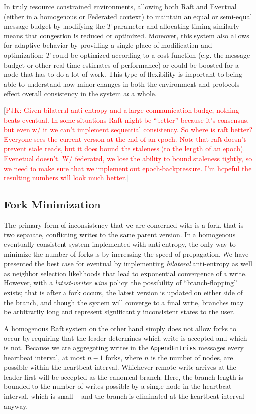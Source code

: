 \documentclass[10pt,conference,compsocconf,letterpaper]{IEEEtran}
\newcommand{\todo}[1]{{\textcolor{red}{#1}}}
\newcommand{\pjk}[1]{[\todo{PJK: #1}]}
\begin{document}
In truly resource constrained environments, allowing both Raft and Eventual (either in a homogenous or Federated context) to maintain an equal or semi-equal message budget by modifying the $T$ parameter and allocating timing similarly means that congestion is reduced or optimized. Moreover, this system also allows for adaptive behavior by providing a single place of modification and optimization; $T$ could be optimized according to a cost function (e.g. the message budget or other real time estimates of performance) or could be boosted for a node that has to do a lot of work. This type of flexibility is important to being able to understand how minor changes in both the environment and protocols effect overall consistency in the system as a whole.

\pjk{Given bilateral anti-entropy and a large communication budge, nothing beats eventual. In some situations Raft might be ``better'' because it's consensus, but even w/ it we can't implement sequential consistency. So where is raft better?  Everyone sees the current version at the end of an epoch. Note that raft doesn't prevent stale reads, but it does bound the staleness (to the length of an epoch). Evenetual doesn't.   W/ federated, we lose the ability to bound staleness tightly, so we need to make sure that we implement out epoch-backpressure. I'm hopeful the resulting numbers will look much better.}

\subsection{Fork Minimization}

The primary form of inconsistency that we are concerned with is a fork, that is two separate, conflicting writes to the same parent version. In a homogenous eventually consistent system implemented with anti-entropy, the only way to minimize the number of forks is by increasing the speed of propagation. We have presented the best case for eventual by implementing \textit{bilateral} anti-entropy as well as neighbor selection likelihoods that lead to exponential convergence of a write. However, with a \textit{latest-writer wins} policy, the possibility of ``branch-flopping'' exists; that is after a fork occurs, the latest version is updated on either side of the branch, and though the system will converge to a final write, branches may be arbitrarily long and represent significantly inconsistent states to the user.

A homogenous Raft system on the other hand simply does not allow forks to occur by requiring that the leader determines which write is accepted and which is not. Because we are aggregating writes in the \texttt{AppendEntries} messages every heartbeat interval, at most $n-1$ forks, where $n$ is the number of nodes, are possible within the heartbeat interval. Whichever remote write arrives at the leader first will be accepted as the canonical branch. Here, the branch length is bounded to the number of writes possible by a single node in the heartbeat interval, which is small -- and the branch is eliminated at the heartbeat interval anyway.
\end{document}

